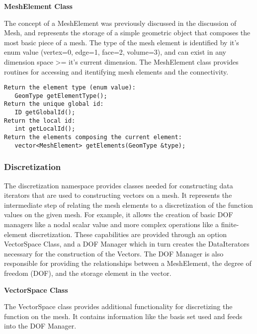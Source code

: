 \documentclass[10pt]{article}
\newenvironment{codelisting}
{\begin{list}{}{\setlength{\leftmargin}{2em}}\item\scriptsize\normalsize}
{\end{list}}
\begin{document}
\vspace{6 mm}\noindent\textbf{MeshElement Class}

The concept of a MeshElement was previously discussed in the discussion of Mesh, and represents the storage of a simple geometric object that composes the most basic piece of a mesh.  The type of the mesh element is identified by it's enum value (vertex=0, edge=1, face=2, volume=3), and can exist in any dimension space >= it's current dimension.  The MeshElement class provides routines for accessing and itentifying mesh elements and the connectivity.
\begin{codelisting}
\begin{verbatim}
Return the element type (enum value):
   GeomType getElementType();
Return the unique global id:
   ID getGlobalId();
Return the local id:
   int getLocalId();
Return the elements composing the current element:
   vector<MeshElement> getElements(GeomType &type);
\end{verbatim}
\end{codelisting}



\subsubsection{Discretization}

The discretization namespace provides classes needed for constructing data iterators that are used to constructing vectors on a mesh.  It represents the intermediate step of relating the mesh elements to a discretization of the function values on the given mesh.  For example, it allows the creation of basic DOF managers like a nodal scalar value and more complex operations like a finite-element discretization.  These capabilities are provided through an option VectorSpace Class, and a DOF Manager which in turn creates the DataIterators necessary for the construction of the Vectors.  The DOF Manager is also responsible for providing the relationships between a MeshElement, the degree of freedom (DOF), and the storage element in the vector.  


\vspace{6 mm}\noindent\textbf{VectorSpace Class}

The VectorSpace class provides additional functionality for discretizing the function on the mesh.  It contains information like the basis set used and feeds into the DOF Manager.
\end{document}
